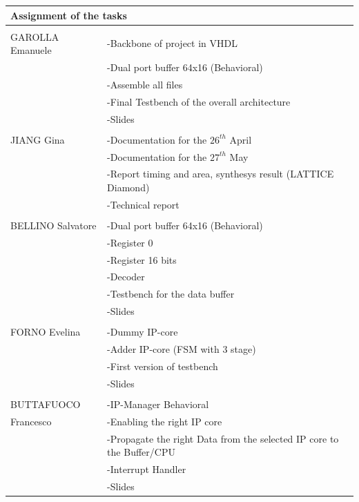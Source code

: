 \begin{table}
	\begin{tabular}{p{3.5cm}|  p{12.1cm}}
		\multicolumn{2}{p{15.0cm}}{ \LARGE{{Assignment of the tasks }}}\\
		\hline \hline 
		\multicolumn{2}{p{1.0cm}}{ \Large{{}}}\\
		GAROLLA Emanuele& -Backbone of project in VHDL\\
		& -Dual port buffer 64x16 (Behavioral)\\
		&-Assemble all files\\	
	 &-Final Testbench of the overall architecture	 \\
		 & -Slides\\
		
		\multicolumn{2}{p{1.0cm}}{ \Large{{}}}\\
		JIANG Gina& -Documentation for the $ 26^{th} $ April\\
		&-Documentation for the $ 27^{th} $ May\\
		&-Report timing and area, synthesys result (LATTICE Diamond)\\
		&-Technical report\\
		\multicolumn{2}{p{1.0cm}}{ \Large{{ }}}\\
		
		BELLINO Salvatore& -Dual port buffer 64x16 (Behavioral)\\
		&\qquad -Register 0\\
		&\qquad -Register 16 bits\\
		&\qquad -Decoder\\
		&-Testbench for the data buffer\\
		&-Slides	\\
			
\multicolumn{2}{p{1.0cm}}{ \Large{{ }}}\\	
		FORNO Evelina& -Dummy IP-core\\
		&-Adder IP-core (FSM with 3 stage)\\
		&-First version of testbench\\
		&-Slides\\
		\multicolumn{2}{p{1.0cm}}{ \Large{{ }}}\\
		BUTTAFUOCO & -IP-Manager Behavioral\\
		Francesco&\qquad-Enabling the right IP core\\
		&\qquad-Propagate the right Data from the selected IP core to the Buffer/CPU\\
		&\qquad-Interrupt Handler\\
		&-Slides\\	
	\end{tabular}
\end{table}
